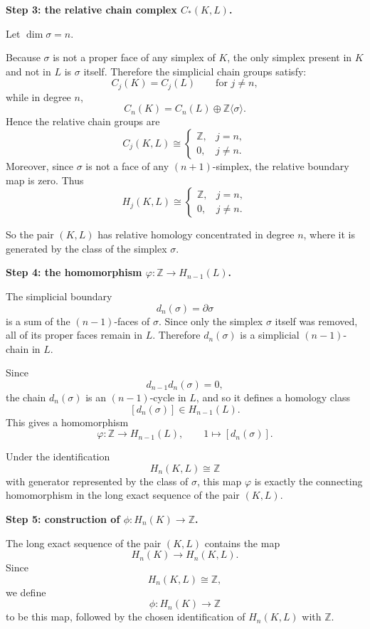 \documentclass[12pt,a4paper]{article}
\theoremstyle{notespace}
\begin{document}
\medskip

\textbf{Step 3: the relative chain complex \(C_*(K,L)\).}

Let \(\dim \sigma = n\).

Because \(\sigma\) is not a proper face of any simplex of \(K\), the only simplex present in \(K\) and not in \(L\) is \(\sigma\) itself. Therefore the simplicial chain groups satisfy:
\[
C_j(K)=C_j(L)\qquad \text{for } j\neq n,
\]
while in degree \(n\),
\[
C_n(K)=C_n(L)\oplus \mathbb Z\langle \sigma\rangle.
\]
Hence the relative chain groups are
\[
C_j(K,L)\cong
\begin{cases}
	\mathbb Z, & j=n,\\
	0, & j\neq n.
\end{cases}
\]
Moreover, since \(\sigma\) is not a face of any \((n+1)\)-simplex, the relative boundary map is zero. Thus
\[
H_j(K,L)\cong
\begin{cases}
	\mathbb Z, & j=n,\\
	0, & j\neq n.
\end{cases}
\]

So the pair \((K,L)\) has relative homology concentrated in degree \(n\), where it is generated by the class of the simplex \(\sigma\).

\medskip

\textbf{Step 4: the homomorphism \(\varphi:\mathbb Z\to H_{n-1}(L)\).}

The simplicial boundary
\[
d_n(\sigma)=\partial \sigma
\]
is a sum of the \((n-1)\)-faces of \(\sigma\). Since only the simplex \(\sigma\) itself was removed, all of its proper faces remain in \(L\). Therefore \(d_n(\sigma)\) is a simplicial \((n-1)\)-chain in \(L\).

Since
\[
d_{n-1}d_n(\sigma)=0,
\]
the chain \(d_n(\sigma)\) is an \((n-1)\)-cycle in \(L\), and so it defines a homology class
\[
[d_n(\sigma)]\in H_{n-1}(L).
\]
This gives a homomorphism
\[
\varphi:\mathbb Z\to H_{n-1}(L),
\qquad
1\mapsto [d_n(\sigma)].
\]

Under the identification
\[
H_n(K,L)\cong \mathbb Z
\]
with generator represented by the class of \(\sigma\), this map \(\varphi\) is exactly the connecting homomorphism in the long exact sequence of the pair \((K,L)\).

\medskip

\textbf{Step 5: construction of \(\phi:H_n(K)\to \mathbb Z\).}

The long exact sequence of the pair \((K,L)\) contains the map
\[
H_n(K)\to H_n(K,L).
\]
Since
\[
H_n(K,L)\cong \mathbb Z,
\]
we define
\[
\phi:H_n(K)\to \mathbb Z
\]
to be this map, followed by the chosen identification of \(H_n(K,L)\) with \(\mathbb Z\).
\end{document}
